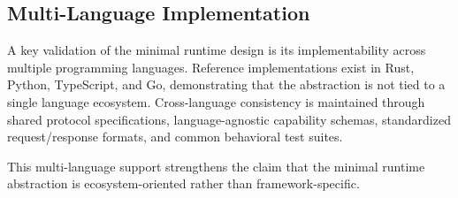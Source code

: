 \subsection{Multi-Language Implementation}

A key validation of the minimal runtime design is its implementability across multiple programming languages. Reference implementations exist in Rust, Python, TypeScript, and Go, demonstrating that the abstraction is not tied to a single language ecosystem. Cross-language consistency is maintained through shared protocol specifications, language-agnostic capability schemas, standardized request/response formats, and common behavioral test suites.

This multi-language support strengthens the claim that the minimal runtime abstraction is ecosystem-oriented rather than framework-specific.
